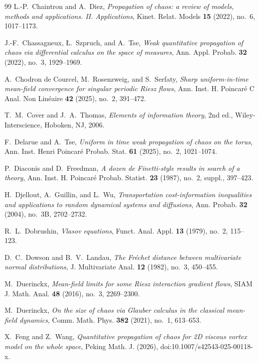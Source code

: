 \documentclass[11pt]{amsart}
\numberwithin{equation}{section}
\theoremstyle{plain}
\theoremstyle{remark}
\begin{document}
\begin{thebibliography}{99}
L.-P.~Chaintron and A.~Diez, \emph{Propagation of chaos: a review of models, methods and applications. II. Applications}, Kinet. Relat. Models \textbf{15} (2022), no.~6, 1017--1173.

J.-F.~Chassagneux, \L.~Szpruch, and A.~Tse, \emph{Weak quantitative propagation of chaos via differential calculus on the space of measures}, Ann. Appl. Probab. \textbf{32} (2022), no.~3, 1929--1969.

A.~Chodron de Courcel, M.~Rosenzweig, and S.~Serfaty, \emph{Sharp uniform-in-time mean-field convergence for singular periodic Riesz flows}, Ann. Inst. H. Poincar\'e C Anal. Non Lin\'eaire \textbf{42} (2025), no.~2, 391--472.

T.~M.~Cover and J.~A.~Thomas, \emph{Elements of information theory}, 2nd ed., Wiley-Interscience, Hoboken, NJ, 2006.

F.~Delarue and A.~Tse, \emph{Uniform in time weak propagation of chaos on the torus}, Ann. Inst. Henri Poincar\'e Probab. Stat. \textbf{61} (2025), no.~2, 1021--1074.

P.~Diaconis and D.~Freedman, \emph{A dozen de Finetti-style results in search of a theory}, Ann. Inst. H. Poincar\'e Probab. Statist. \textbf{23} (1987), no.~2, suppl., 397--423.

H.~Djellout, A.~Guillin, and L.~Wu, \emph{Transportation cost-information inequalities and applications to random dynamical systems and diffusions}, Ann. Probab. \textbf{32} (2004), no.~3B, 2702--2732.

R.~L.~Dobrushin, \emph{Vlasov equations}, Funct. Anal. Appl. \textbf{13} (1979), no.~2, 115--123.

D.~C.~Dowson and B.~V.~Landau, \emph{The Fr\'echet distance between multivariate normal distributions}, J. Multivariate Anal. \textbf{12} (1982), no.~3, 450--455.

M.~Duerinckx, \emph{Mean-field limits for some Riesz interaction gradient flows}, SIAM J. Math. Anal. \textbf{48} (2016), no.~3, 2269--2300.

M.~Duerinckx, \emph{On the size of chaos via Glauber calculus in the classical mean-field dynamics}, Comm. Math. Phys. \textbf{382} (2021), no.~1, 613--653.

X.~Feng and Z.~Wang, \emph{Quantitative propagation of chaos for 2D viscous vortex model on the whole space}, Peking Math. J. (2026), doi:10.1007/s42543-025-00118-x.


\end{thebibliography}
\end{document}
